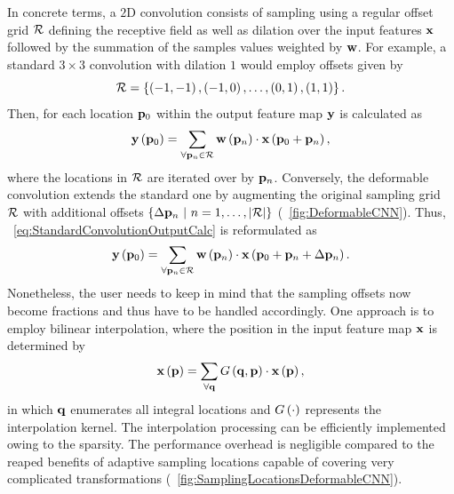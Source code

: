 In concrete terms, a $2$D convolution consists of sampling using a regular offset grid $\mathcal{R}$ defining the receptive field as well as dilation over the input features $\mathbf{x}$ followed by the summation of the samples values weighted by $\mathbf{w}$. For example, a standard $3 \times 3$ convolution with dilation $1$ would employ offsets given by
\begin{equation}
  \label{eq:StandardConvolutionOffsetGrid}
  \mathcal{R} = \left\{ {
    \left( {-1, -1} \right), \left( {-1, 0} \right), \dots, \left( {0, 1} \right), \left( {1, 1} \right)
  } \right\}.
\end{equation}
Then, for each location $\mathbf{p}_0$ within the output feature map $\mathbf{y}$ is calculated as
\begin{equation}
  \label{eq:StandardConvolutionOutputCalc}
  {\mathbf{y}} \left( \mathbf{p}_0 \right) =
  \sum_{\forall \mathbf{p}_n \in \mathcal{R}}
  {\mathbf{w}} \left( \mathbf{p}_n \right) \cdot {\mathbf{x}} \left( \mathbf{p}_0 + \mathbf{p}_n \right),
\end{equation}
where the locations in $\mathcal{R}$ are iterated over by $\mathbf{p}_n$. Conversely, the deformable convolution extends the standard one by augmenting the original sampling grid $\mathcal{R}$ with additional offsets $\left\{ {\Delta \mathbf{p}_n \ |\ n = 1, \dots, \left\vert \mathcal{R} \right\vert} \right\}$ (\figtext{}~\ref{fig:DeformableCNN}). Thus, \eqtext{}~\ref{eq:StandardConvolutionOutputCalc} is reformulated as
\begin{equation}
  \label{eq:DeformableConvolutionOutputCalc}
  {\mathbf{y}} \left( \mathbf{p}_0 \right) =
  \sum_{\forall \mathbf{p}_n \in \mathcal{R}}
  {\mathbf{w}} \left( \mathbf{p}_n \right) \cdot {\mathbf{x}} \left( \mathbf{p}_0 + \mathbf{p}_n + \Delta \mathbf{p}_n \right).
\end{equation}
Nonetheless, the user needs to keep in mind that the sampling offsets now become fractions and thus have to be handled accordingly. One approach is to employ bilinear interpolation, where the position in the input feature map $\mathbf{x}$ is determined by
\begin{equation}
  \label{eq:DeformableConvolutionBilinear}
  {\mathbf{x}} \left( \mathbf{p} \right) =
  \sum_{\forall \mathbf{q}} {G} \left( \mathbf{q}, \mathbf{p} \right) \cdot {\mathbf{x}} \left( \mathbf{p} \right),
\end{equation}
in which $\mathbf{q}$ enumerates all integral locations and ${G} \left( \cdot \right)$ represents the  interpolation kernel. The interpolation processing can be efficiently implemented owing to the sparsity. The performance overhead is negligible compared to the reaped benefits of adaptive sampling locations capable of covering very complicated transformations (\figtext{}~\ref{fig:SamplingLocationsDeformableCNN}).

